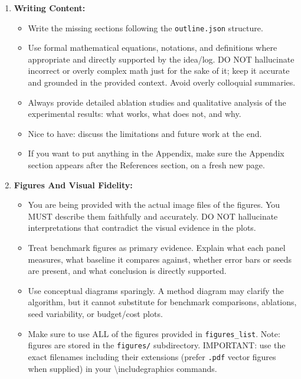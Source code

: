\begin{enumerate}
\begin{itemize}
        \item Relevance rule: do not cite papers merely because they share a generic phrase such as "adaptive", "graph", "structure", or "compute". Every citation must be directly about the paper's task, method family, benchmark, or decision setting.
    \end{itemize}
    \item \textbf{Writing Content:}
    \begin{itemize}
        \item Write the missing sections following the \texttt{outline.json} structure.
        \item Use formal mathematical equations, notations, and definitions where appropriate and directly supported by the idea/log. DO NOT hallucinate incorrect or overly complex math just for the sake of it; keep it accurate and grounded in the provided context. Avoid overly colloquial summaries.
        \item Always provide detailed ablation studies and qualitative analysis of the experimental results: what works, what does not, and why.
        \item Nice to have: discuss the limitations and future work at the end.
        \item If you want to put anything in the Appendix, make sure the Appendix section appears after the References section, on a fresh new page.
    \end{itemize}
    \item \textbf{Figures And Visual Fidelity:}
    \begin{itemize}
        \item You are being provided with the actual image files of the figures. You MUST describe them faithfully and accurately. DO NOT hallucinate interpretations that contradict the visual evidence in the plots.
        \item Treat benchmark figures as primary evidence. Explain what each panel measures, what baseline it compares against, whether error bars or seeds are present, and what conclusion is directly supported.
        \item Use conceptual diagrams sparingly. A method diagram may clarify the algorithm, but it cannot substitute for benchmark comparisons, ablations, seed variability, or budget/cost plots.
        \item Make sure to use ALL of the figures provided in \texttt{figures\_list}. Note: figures are stored in the \texttt{figures/} subdirectory. IMPORTANT: use the exact filenames including their extensions (prefer \texttt{.pdf} vector figures when supplied) in your \textbackslash{}includegraphics commands.

\end{itemize}
\end{enumerate}
